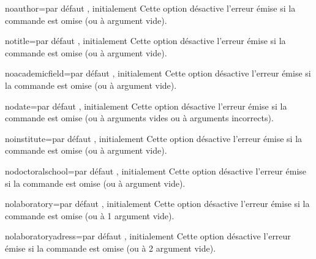 \begin{docKey}{noauthor}{=\textbar{}}{par défaut
    , initialement }
  Cette option désactive l'erreur émise si la commande  est
  omise (ou à argument vide).
\end{docKey}
\begin{docKey}{notitle}{=\textbar{}}{par défaut
    , initialement }
  Cette option désactive l'erreur émise si la commande  est omise
  (ou à argument vide).
\end{docKey}
\begin{docKey}{noacademicfield}{=\textbar{}}{par
    défaut , initialement }
  Cette option désactive l'erreur émise si la commande 
  est omise (ou à argument vide).
\end{docKey}
\begin{docKey}{nodate}{=\textbar{}}{par défaut
    , initialement }
  Cette option désactive l'erreur émise si la commande  est omise
  (ou à arguments vides ou à arguments incorrects).
\end{docKey}
\begin{docKey}{noinstitute}{=\textbar{}}{par
    défaut , initialement }
  Cette option désactive l'erreur émise si la commande  est
  omise (ou à argument vide).
\end{docKey}
\begin{docKey}{nodoctoralschool}{=\textbar{}}{par
    défaut , initialement }
  Cette option désactive l'erreur émise si la commande 
  est omise (ou à argument vide).
\end{docKey}
\begin{docKey}{nolaboratory}{=\textbar{}}{par
    défaut , initialement }
  Cette option désactive l'erreur émise si la commande  est
  omise (ou à 1\ier{} argument vide).
\end{docKey}
\begin{docKey}{nolaboratoryadress}{=\textbar{}}{par
    défaut , initialement }
  Cette option désactive l'erreur émise si la commande  est
  omise (ou à 2\ieme{} argument vide).
\end{docKey}
